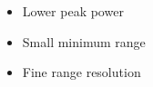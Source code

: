\documentclass[preview]{standalone}
\begin{document}
\begin{center}
\begin{itemize}\item Lower peak power\item Small minimum range\item Fine range resolution\end{itemize}
\end{center}
\end{document}
